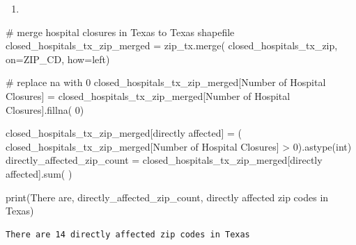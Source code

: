 \documentclass[
  letterpaper,
  DIV=11,
  numbers=noendperiod]{scrartcl}
\newenvironment{Shaded}{\begin{snugshade}}{\end{snugshade}}
\newcommand{\BuiltInTok}[1]{\textcolor[rgb]{0.00,0.23,0.31}{#1}}
\newcommand{\CommentTok}[1]{\textcolor[rgb]{0.37,0.37,0.37}{#1}}
\newcommand{\DecValTok}[1]{\textcolor[rgb]{0.68,0.00,0.00}{#1}}
\newcommand{\NormalTok}[1]{\textcolor[rgb]{0.00,0.23,0.31}{#1}}
\newcommand{\OperatorTok}[1]{\textcolor[rgb]{0.37,0.37,0.37}{#1}}
\newcommand{\StringTok}[1]{\textcolor[rgb]{0.13,0.47,0.30}{#1}}
\providecommand{\tightlist}{%
  \setlength{\itemsep}{0pt}\setlength{\parskip}{0pt}}\usepackage{longtable,booktabs,array}
\begin{document}
\begin{enumerate}
\def\labelenumi{\arabic{enumi}.}
\setcounter{enumi}{1}
\tightlist
\item
\end{enumerate}

\begin{Shaded}
\begin{Highlighting}[]
\CommentTok{\# merge hospital closures in Texas to Texas shapefile}
\NormalTok{closed\_hospitals\_tx\_zip\_merged }\OperatorTok{=}\NormalTok{ zip\_tx.merge(}
\NormalTok{    closed\_hospitals\_tx\_zip, on}\OperatorTok{=}\StringTok{\textquotesingle{}ZIP\_CD\textquotesingle{}}\NormalTok{, how}\OperatorTok{=}\StringTok{\textquotesingle{}left\textquotesingle{}}\NormalTok{)}

\CommentTok{\# replace na with 0}
\NormalTok{closed\_hospitals\_tx\_zip\_merged[}\StringTok{\textquotesingle{}Number of Hospital Closures\textquotesingle{}}\NormalTok{] }\OperatorTok{=}\NormalTok{ closed\_hospitals\_tx\_zip\_merged[}\StringTok{\textquotesingle{}Number of Hospital Closures\textquotesingle{}}\NormalTok{].fillna(}
    \DecValTok{0}\NormalTok{)}

\NormalTok{closed\_hospitals\_tx\_zip\_merged[}\StringTok{\textquotesingle{}directly affected\textquotesingle{}}\NormalTok{] }\OperatorTok{=}\NormalTok{ (}
\NormalTok{    closed\_hospitals\_tx\_zip\_merged[}\StringTok{\textquotesingle{}Number of Hospital Closures\textquotesingle{}}\NormalTok{] }\OperatorTok{\textgreater{}} \DecValTok{0}\NormalTok{).astype(}\BuiltInTok{int}\NormalTok{)}
\NormalTok{directly\_affected\_zip\_count }\OperatorTok{=}\NormalTok{ closed\_hospitals\_tx\_zip\_merged[}\StringTok{\textquotesingle{}directly affected\textquotesingle{}}\NormalTok{].}\BuiltInTok{sum}\NormalTok{(}
\NormalTok{)}

\BuiltInTok{print}\NormalTok{(}\StringTok{\textquotesingle{}There are\textquotesingle{}}\NormalTok{, directly\_affected\_zip\_count,}
      \StringTok{\textquotesingle{}directly affected zip codes in Texas\textquotesingle{}}\NormalTok{)}
\end{Highlighting}
\end{Shaded}

\begin{verbatim}
There are 14 directly affected zip codes in Texas
\end{verbatim}
\end{document}
